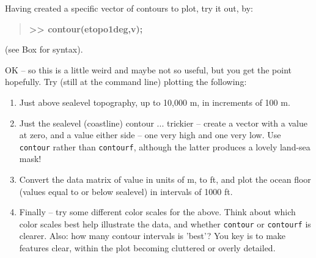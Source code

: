 \documentclass{tufte-book} %
\newenvironment{docspecbold}{\begin{quotation}\ttfamily\bfseries\parskip0pt\parindent0pt\ignorespaces}{\end{quotation}}
\begin{document}
Having created a specific vector of contours to plot, try it out, by:
\begin{docspecbold}
>> contour(etopo1deg,v);
\end{docspecbold}
(see Box for syntax).

OK -- so this is a little weird and maybe not so useful, but you get the point hopefully. Try (still at the command line) plotting the following:

\begin{enumerate}[noitemsep]
\setlength{\itemindent}{.2in}
\item Just above sealevel topography, up to 10,000 m, in increments of 100 m.
\item Just the sealevel (coastline) contour ... trickier -- create a vector with a value at zero, and a value either side -- one very high and one very low. Use \texttt{contour} rather than \texttt{contourf}, although the latter produces a lovely land-sea mask!
\item Convert the data matrix of value in units of m, to ft, and plot the ocean floor (values equal to or below sealevel) in intervals of 1000 ft.
\item Finally -- try some different color scales for the above. Think about which color scales best help illustrate the data, and whether \texttt{contour} or \texttt{contourf} is clearer. Also: how many contour intervals is 'best'? You key is to make features clear, within the plot becoming cluttered or overly detailed.
\end{enumerate}
\end{document}

